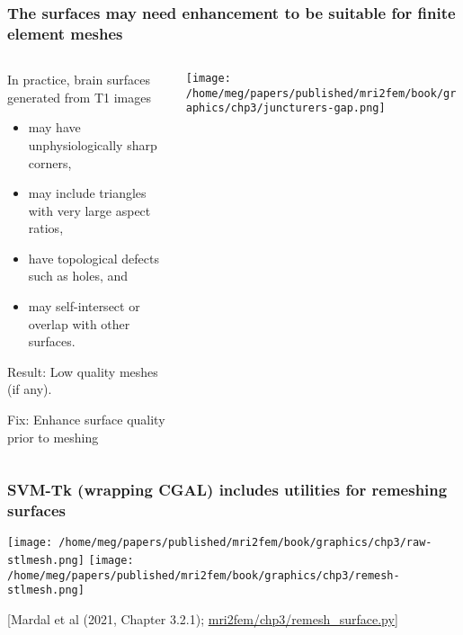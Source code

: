 \documentclass[10pt, mathserif, aspectratio=169, t, usenames, dvipsnames]{beamer}
\newcommand{\refer}[1]{\begin{flushright}{\tiny \textcolor{Cerulean}{[#1]}}\end{flushright}}
\begin{document}
\begin{frame}
\frametitle{The surfaces may need enhancement to be suitable for finite element meshes}

\begin{columns}[T]
\begin{column}{0.6\textwidth}
In practice, brain surfaces generated from T1 images 
\begin{itemize}
\item may have unphysiologically sharp corners,   
\item may include triangles with very large aspect ratios, 
\item have topological defects such as holes, and
\item may self-intersect or overlap with other surfaces.   
\end{itemize}

\medskip

\alert{Result:} Low quality meshes (if any). \\

\medskip

\alert{Fix:} Enhance surface quality prior to meshing
\end{column}
\begin{column}{0.4\textwidth}
  \centering
  \texttt{[image: /home/meg/papers/published/mri2fem/book/graphics/chp3/juncturers-gap.png]}
\end{column}

\end{columns}
\end{frame}

\begin{frame}
  \frametitle{SVM-Tk (wrapping CGAL) includes utilities for remeshing surfaces}
  \centering
  \texttt{[image: /home/meg/papers/published/mri2fem/book/graphics/chp3/raw-stlmesh.png]}
  \texttt{[image: /home/meg/papers/published/mri2fem/book/graphics/chp3/remesh-stlmesh.png]}
  \refer{Mardal et al (2021, Chapter 3.2.1); \href{https://github.com/kent-and/mri2fem/blob/master/mri2fem/mri2fem/chp3/remesh_surface.py}{mri2fem/chp3/remesh\_surface.py}}
\end{frame}
\end{document}
